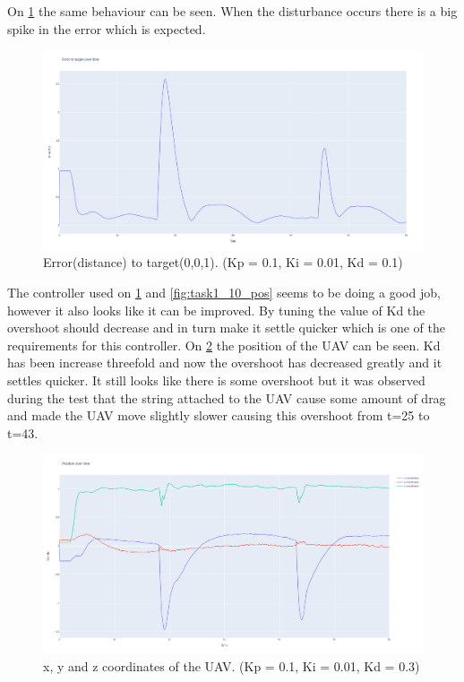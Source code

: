 \documentclass[conference]{IEEEtran}
\begin{document}
On \cref{fig:task1_10_err} the same behaviour can be seen. When the disturbance occurs there is a big spike in the error which is expected. 

\begin{figure}[hbtp]
	\centering
	\includegraphics[width=1.0\linewidth]{images/task1_10_err.png}
	\caption{Error(distance) to target(0,0,1). (Kp = 0.1, Ki = 0.01, Kd = 0.1)}
	\label{fig:task1_10_err}
\end{figure}

The controller used on \cref{fig:task1_10_err} and \cref{fig:task1_10_pos} seems to be doing a good job, however it also looks like it can be improved. By tuning the value of Kd the overshoot should decrease and in turn make it settle quicker which is one of the requirements for this controller. On \cref{fig:task1_11_pos} the position of the UAV can be seen. Kd has been increase threefold and now the overshoot has decreased greatly and it settles quicker. It still looks like there is some overshoot but it was observed during the test that the string attached to the UAV cause some amount of drag and made the UAV move slightly slower causing this overshoot from t=25 to t=43.

\begin{figure}[hbtp]
	\centering
	\includegraphics[width=1.0\linewidth]{images/task1_11_pos.png}
	\caption{x, y and z coordinates of the UAV. (Kp = 0.1, Ki = 0.01, Kd = 0.3)}
	\label{fig:task1_11_pos}
\end{figure}
\end{document}
